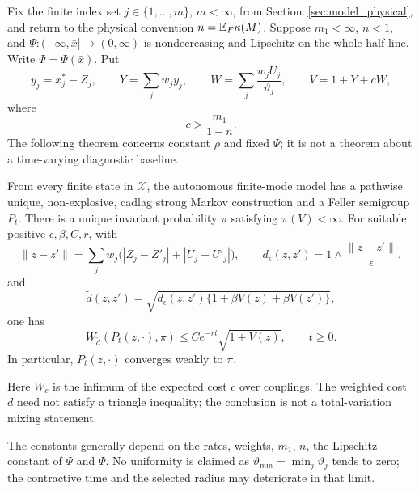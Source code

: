 Fix the finite index set \(j\in\{1,\ldots,m\}\), \(m<\infty\), from Section~\ref{sec:model_physical}, and return to the physical convention \(n=\mathbb{E} _F\kappa(M)\). Suppose \(m_1<\infty\), \(n<1\), and \(\Psi:(-\infty,\bar x]\to(0,\infty)\) is nondecreasing and Lipschitz on the whole half-line. Write \(\bar\Psi=\Psi(\bar x)\). Put
\[
y_j=x_j^*-Z_j,\qquad Y=\sum_jw_jy_j,\qquad
W=\sum_j\frac{w_jU_j}{\vartheta_j},\qquad V=1+Y+cW,
\]
where
\begin{equation}\label{eq:c-choice}
c>\frac{m_1}{1-n}.
\end{equation}
The following theorem concerns constant \(\rho\) and fixed \(\Psi\); it is not a theorem about a time-varying diagnostic baseline.

\begin{theorem}\label{thm:finite_mode}
From every finite state in \(\mathcal X\), the autonomous finite-mode model has a pathwise unique, non-explosive, cadlag strong Markov construction and a Feller semigroup \(P_t\). There is a unique invariant probability \(\pi\) satisfying \(\pi(V)<\infty\). For suitable positive \(\epsilon,\beta,C,r\), with
\[
\|z-z'\|=\sum_jw_j\bigl(|Z_j-Z'_j|+|U_j-U'_j|\bigr),\qquad
d_\epsilon(z,z')=1\wedge\frac{\|z-z'\|}{\epsilon},
\]
and
\[
\widetilde d(z,z')=
\sqrt{d_\epsilon(z,z')\{1+\beta V(z)+\beta V(z')\}},
\]
one has
\begin{equation}\label{eq:weighted-contraction}
W_{\widetilde d}(P_t(z,\cdot),\pi)
\leq Ce^{-rt}\sqrt{1+V(z)},\qquad t\geq0.
\end{equation}
In particular, \(P_t(z,\cdot)\) converges weakly to \(\pi\).
\end{theorem}

Here \(W_c\) is the infimum of the expected cost \(c\) over couplings. The weighted cost \(\widetilde d\) need not satisfy a triangle inequality; the conclusion is not a total-variation mixing statement.

The constants generally depend on the rates, weights, \(m_1\), \(n\), the Lipschitz constant of \(\Psi\) and \(\bar\Psi\). No uniformity is claimed as \(\vartheta_{\min}=\min_j\vartheta_j\) tends to zero; the contractive time and the selected radius may deteriorate in that limit.

